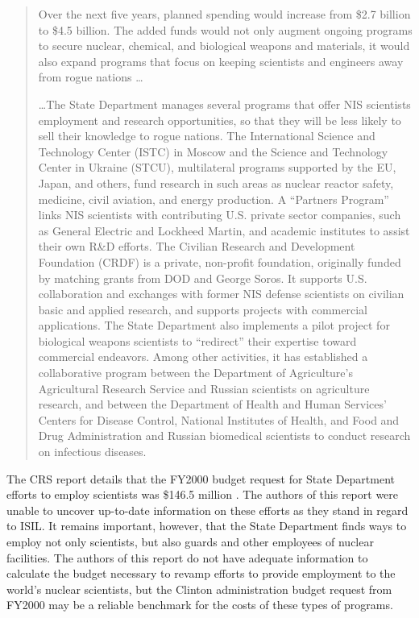 \documentclass{report}
\begin{document}
\blockquote{Over the next five years, planned spending would increase from \$2.7 billion to \$4.5 billion. The added funds would not only augment ongoing programs to secure nuclear, chemical, and biological weapons and materials, it would also expand programs that focus on keeping scientists and engineers away from rogue nations \ldots

\ldots The State Department manages several programs that offer NIS scientists employment and research opportunities, so that they will be less likely to sell their knowledge to rogue nations. The International Science and Technology Center (ISTC) in Moscow and the Science and Technology Center in Ukraine (STCU), multilateral programs supported by the EU, Japan, and others, fund research in such areas as nuclear reactor safety, medicine, civil aviation, and energy production. A \enquote{Partners Program} links NIS scientists with contributing U.S. private sector companies, such as General Electric and Lockheed Martin, and academic institutes to assist their own R\&D efforts. The Civilian Research and Development Foundation (CRDF) is a private, non-profit foundation, originally funded by matching grants from DOD and George Soros. It supports U.S. collaboration and exchanges with former NIS defense scientists on civilian basic and applied research, and supports projects with commercial applications. The State Department also implements a pilot project for biological weapons scientists to \enquote{redirect} their expertise toward commercial endeavors. Among other activities, it has established a collaborative program between the Department of Agriculture's Agricultural Research Service and Russian scientists on agriculture research, and between the Department of Health and Human Services' Centers for Disease Control, National Institutes of Health, and Food and Drug Administration and Russian biomedical scientists to conduct research on infectious diseases. }

The CRS report details that the FY2000 budget request for State Department efforts to employ scientists was \$146.5 million \cite{Woolf1999}. The authors of this report were unable to uncover up-to-date information on these efforts as they stand in regard to ISIL. It remains important, however, that the State Department finds ways to employ not only scientists, but also guards and other employees of nuclear facilities. The authors of this report do not have adequate information to calculate the budget necessary to revamp efforts to provide employment to the world's nuclear scientists, but the Clinton administration budget request from FY2000 may be a reliable benchmark for the costs of these types of programs. 
\end{document}
